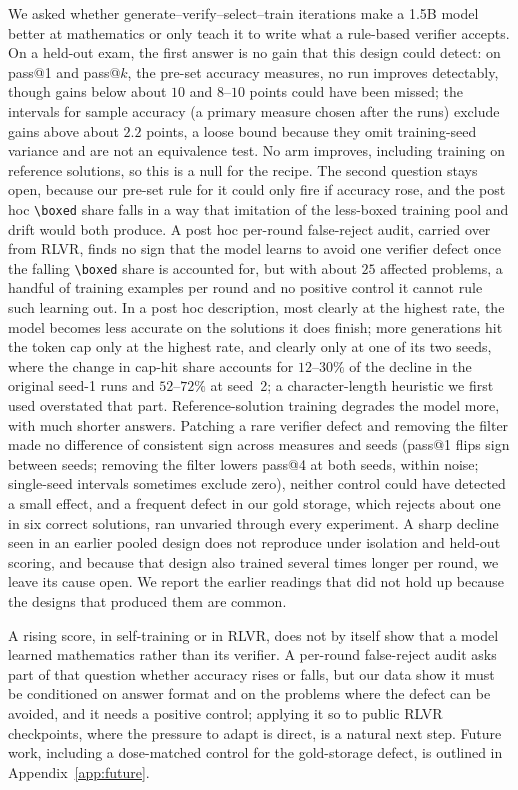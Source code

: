 \documentclass[runningheads]{llncs}
\begin{document}
We asked whether generate--verify--select--train iterations make a 1.5B model
better at mathematics or only teach it to write what a rule-based verifier
accepts. On a held-out exam, the first answer is no gain that this design
could detect: on pass@1 and pass@$k$, the pre-set accuracy measures, no run
improves detectably, though gains below about $10$ and $8$--$10$ points could
have been missed; the intervals for sample accuracy (a primary measure chosen
after the runs) exclude gains above about $2.2$ points, a loose bound because
they omit training-seed variance and are not an equivalence test. No arm
improves, including training on reference solutions, so this is a null for
the recipe. The second question stays open, because our pre-set rule for it
could only fire if accuracy rose, and the post hoc \verb|\boxed| share falls
in a way that imitation of the less-boxed training pool and drift would both
produce. A post hoc per-round false-reject audit, carried over from RLVR,
finds no sign that the model learns to avoid one verifier defect once the
falling \verb|\boxed| share is accounted for, but with about $25$ affected
problems, a handful of training examples per round and no positive control it
cannot rule such learning out. In a post hoc description, most clearly at the
highest rate, the model becomes less accurate on the solutions it does finish;
more generations hit the token cap only at the highest rate, and clearly only
at one of its two seeds, where the change in cap-hit share accounts for
$12$--$30\%$ of the decline in the original seed-1 runs and $52$--$72\%$ at
seed~2; a character-length heuristic we first used overstated that part.
Reference-solution training degrades the model more, with much shorter answers.
Patching a rare verifier defect and removing the filter made no difference of
consistent sign across measures and seeds (pass@1 flips sign between seeds;
removing the filter lowers pass@4 at both seeds, within noise; single-seed
intervals sometimes exclude zero), neither control could have detected a small effect,
and a frequent defect in our gold storage, which rejects about one in six
correct solutions, ran unvaried through every experiment. A sharp
decline seen in an earlier pooled design does not reproduce under isolation and
held-out scoring, and because that design also trained several times longer per
round, we leave its cause open. We report the earlier readings that did not hold
up because the designs that produced them are common.

A rising score, in self-training or in RLVR, does not by itself show that a
model learned mathematics rather than its verifier. A per-round false-reject
audit asks part of that question whether accuracy rises or falls, but our
data show it must be conditioned on answer format and on the problems where
the defect can be avoided, and it needs a positive control; applying it so to
public RLVR checkpoints, where the pressure to adapt is direct, is a natural
next step.
Future work, including a dose-matched control for the gold-storage defect,
is outlined in Appendix~\ref{app:future}.
\end{document}
